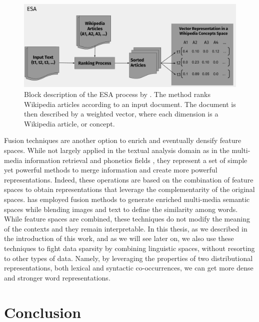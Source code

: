 \begin{figure}
\centering
\includegraphics[width=\linewidth]{images/Chapitre2/esa.pdf}
\caption{Block description of the ESA process by \cite{gabrilovich2007computing}. The method ranks Wikipedia articles according to an input document. The document is then described by a weighted vector, where each dimension is a Wikipedia article, or concept.}
\label{fig:esa}
\end{figure}

Fusion techniques are another option to enrich and eventually densify feature spaces.  While not largely applied in the textual analysis domain as in the multi-media information retrieval and phonetics fields \cite{ozkan2010latent,Ah-PineCC15}, they represent a set of simple yet powerful methods to merge information and create more powerful representations. Indeed, these operations are based on the combination of feature spaces  to obtain representations that leverage the complementarity of the original spaces. \cite{bruni2014multimodal} has employed fusion methods to generate enriched multi-media semantic spaces while blending images and text to define the similarity among words. While feature spaces are combined, these techniques do not modify the meaning of the contexts and they remain interpretable. In this thesis, as we described in the introduction of this work, and as we will see later on, we also use these techniques to fight data sparsity by combining linguistic spaces, without resorting to other types of data. Namely,  by leveraging the properties of two distributional representations, both lexical and syntactic co-occurrences, we can get more dense and stronger  word representations. 


\section{Conclusion}

